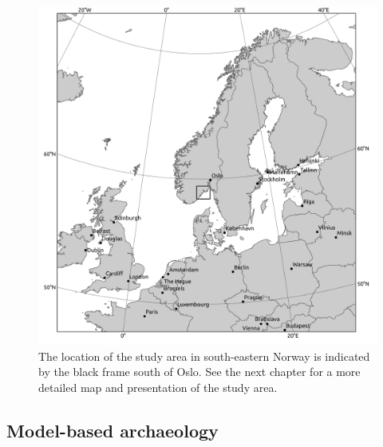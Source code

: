 \documentclass[
  a4paper,
  oneside]{uiophdthesis}
\begin{document}
\begin{figure}

{\centering \includegraphics[width=1\linewidth]{figures/large_overview} 

}

\caption{The location of the study area in south-eastern Norway is indicated by the black frame south of Oslo. See the next chapter for a more detailed map and presentation of the study area.}\label{fig:map}
\end{figure}

\hypertarget{model-based-archaeology}{%
\subsection{Model-based archaeology}\label{model-based-archaeology}}
\end{document}
